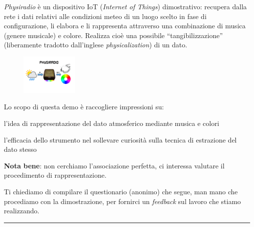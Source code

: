 \textit{Physiradio} è un dispositivo IoT (\textit{Internet of Things}) dimostrativo: recupera dalla rete i dati relativi alle condizioni meteo di un luogo scelto in fase di configurazione, li elabora e li rappresenta attraverso una combinazione di musica (genere musicale) e colore. Realizza cioè una possibile ``tangibilizzazione'' (liberamente tradotto dall'inglese \textit{physicalization}) di un dato.

\setlength\intextsep{0pt}
\begin{figure}
	\vspace{-20pt} %
	\begin{center}
		\includegraphics[width=0.25\textwidth]{Immagini/SCHEMA_PHYSIRADIO.png}
	\end{center}
\end{figure}


Lo scopo di questa demo è raccogliere impressioni su:
\begin{compactitem}
	\item l'idea di rappresentazione del dato atmosferico mediante musica e colori
	\item l'efficacia dello strumento nel sollevare curiosità sulla tecnica di estrazione del dato stesso
\end{compactitem}
\textbf{Nota bene}: non cerchiamo l'associazione perfetta, ci interessa valutare il procedimento di rappresentazione.
%

Ti chiediamo di compilare il questionario (anonimo) che segue, man mano che procediamo con la dimostrazione,
per fornirci un \textit{feedback} sul lavoro che stiamo realizzando.


\medskip
\hrule
\medskip

